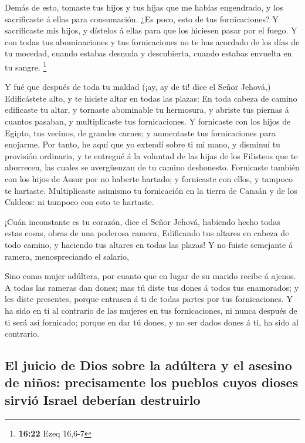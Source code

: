  Demás de esto, tomaste tus hijos y tus hijas que me habías
engendrado, y los sacrificaste á ellas para consumación. ¿Es poco, esto
de tus fornicaciones?  Y sacrificaste mis hijos, y dístelos
á ellas para que los hiciesen pasar por el fuego.  Y con
todas tus abominaciones y tus fornicaciones no te has acordado de los
días de tu mocedad, cuando estabas desnuda y descubierta, cuando estabas
envuelta en tu sangre. \footnote{\textbf{16:22} Ezeq 16,6-7}

 Y fué que después de toda tu maldad (¡ay, ay de ti! dice
el Señor Jehová,)  Edificástete alto, y te hiciste altar en
todas las plazas:  En toda cabeza de camino edificaste tu
altar, y tornaste abominable tu hermosura, y abriste tus piernas á
cuantos pasaban, y multiplicaste tus fornicaciones.  Y
fornicaste con los hijos de Egipto, tus vecinos, de grandes carnes; y
aumentaste tus fornicaciones para enojarme.  Por tanto, he
aquí que yo extendí sobre ti mi mano, y disminuí tu provisión ordinaria,
y te entregué á la voluntad de las hijas de los Filisteos que te
aborrecen, las cuales se avergüenzan de tu camino deshonesto.
 Fornicaste también con los hijos de Assur por no haberte
hartado; y fornicaste con ellos, y tampoco te hartaste. 
Multiplicaste asimismo tu fornicación en la tierra de Canaán y de los
Caldeos: ni tampoco con esto te hartaste.

 ¡Cuán inconstante es tu corazón, dice el Señor Jehová,
habiendo hecho todas estas cosas, obras de una poderosa ramera,
 Edificando tus altares en cabeza de todo camino, y
haciendo tus altares en todas las plazas! Y no fuiste semejante á
ramera, menospreciando el salario,

 Sino como mujer adúltera, por cuanto que en lugar de su
marido recibe á ajenos.  A todas las rameras dan dones; mas
tú diste tus dones á todos tus enamorados; y les diste presentes, porque
entrasen á ti de todas partes por tus fornicaciones.  Y ha
sido en ti al contrario de las mujeres en tus fornicaciones, ni nunca
después de ti será así fornicado; porque en dar tú dones, y no ser dados
dones á ti, ha sido al contrario.

\hypertarget{el-juicio-de-dios-sobre-la-aduxfaltera-y-el-asesino-de-niuxf1os-precisamente-los-pueblos-cuyos-dioses-sirviuxf3-israel-deberuxedan-destruirlo}{%
\subsection{El juicio de Dios sobre la adúltera y el asesino de niños:
precisamente los pueblos cuyos dioses sirvió Israel deberían
destruirlo}\label{el-juicio-de-dios-sobre-la-aduxfaltera-y-el-asesino-de-niuxf1os-precisamente-los-pueblos-cuyos-dioses-sirviuxf3-israel-deberuxedan-destruirlo}}

